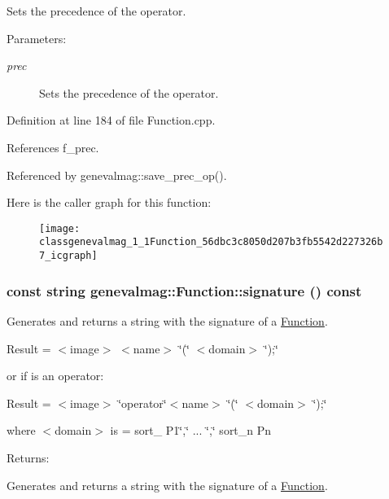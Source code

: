 Sets the precedence of the operator. \begin{Desc}
\item[Parameters:]
\begin{description}
\item[{\em prec}]Sets the precedence of the operator. \end{description}
\end{Desc}


Definition at line 184 of file Function.cpp.

References f\_\-prec.

Referenced by genevalmag::save\_\-prec\_\-op().

Here is the caller graph for this function:\nopagebreak
\begin{figure}[H]
\begin{center}
\leavevmode
\texttt{[image: classgenevalmag\_1\_1Function\_56dbc3c8050d207b3fb5542d227326b7\_icgraph]}
\end{center}
\end{figure}
\hypertarget{classgenevalmag_1_1Function_13bd09282fcdf0edec0b8881939d6928}{
\subsubsection[{signature}]{\setlength{\rightskip}{0pt plus 5cm}const string genevalmag::Function::signature () const}}
\label{classgenevalmag_1_1Function_13bd09282fcdf0edec0b8881939d6928}


Generates and returns a string with the signature of a \hyperlink{classgenevalmag_1_1Function}{Function}.\par
 \par
 Result = $<$image$>$ $<$name$>$ \char`\"{}(\char`\"{} $<$domain$>$ \char`\"{});\char`\"{}\par
 \par
 or if is an operator:\par
 \par
 Result = $<$image$>$ \char`\"{}operator\char`\"{}$<$name$>$ \char`\"{}(\char`\"{} $<$domain$>$ \char`\"{});\char`\"{}\par
 \par
 where $<$domain$>$ is = sort\_ P1\char`\"{},\char`\"{} ... \char`\"{},\char`\"{} sort\_\-n Pn\par


\begin{Desc}
\item[Returns:]\end{Desc}
Generates and returns a string with the signature of a \hyperlink{classgenevalmag_1_1Function}{Function}.

